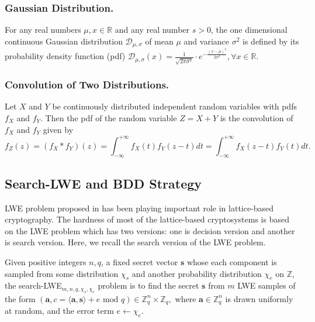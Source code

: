 \documentclass[runningheads]{llncs}
\begin{document}
\subsubsection{Gaussian Distribution.} For any real numbers $\mu, x \in \mathbb{R} $ and any real number $s>0$, the one dimensional continuous Gaussian distribution $\mathcal{D}_{\mu, \sigma}$ of mean $\mu$ and variance $\sigma^2$ is defined by its probability density function (pdf)
$\mathcal{D}_{\mu, \sigma}(x)=\frac{1}{\sqrt{2\pi \sigma^2}} \cdot e^{-\frac{(x-\mu)^2}{2\sigma^2}}, \forall x \in \mathbb{R}.$
\subsubsection{Convolution of Two Distributions.} Let $X$ and $Y$ be continuously distributed independent random variables with pdfs $f_X$ and $f_Y$. Then the pdf of the random variable $Z=X+Y$ is the convolution of $f_X$ and $f_Y$ given by
\begin{equation}\label{keycon}
f_Z(z)=(f_X*f_Y)(z)=\int_{-\infty}^{+\infty}f_X(t)f_Y(z-t)dt=\int_{-\infty}^{+\infty}f_X(z-t)f_Y(t)dt.
\end{equation}

\subsection{ Search-LWE and BDD Strategy}  \label{heu}

LWE problem proposed in \cite{Reg09} has been playing important role in lattice-based cryptography. The hardness of most of the lattice-based cryptosystems is based on the LWE problem which has two versions: one is decision version and another is search version. Here, we recall the search version of the LWE problem.
\begin{definition}
 Given positive integers $n, q$, a fixed secret vector $\mathbf{s}$ whose each component is sampled from some distribution $ \chi_s$ and another probability distribution $\chi_e$ on $ \mathbb{Z}$, the search-LWE$_{m,n,q,\chi_s, \chi_e}$ problem is to find the secret $\mathbf{s}$ from $m$ LWE samples of the form $(\mathbf{a},c=\langle \mathbf{a}, \mathbf{s}\rangle +e \text{ mod } q) \in  \mathbb{Z}_q^n \times  \mathbb{Z}_q,$ where $\mathbf{a} \in \mathbb{Z}_q^n$ is drawn uniformly at random, and the error term $e \leftarrow \chi_e$.
 \end{definition}
	
\end{document}
